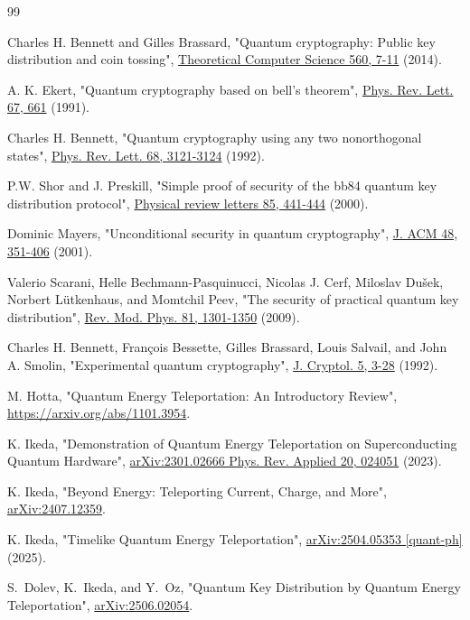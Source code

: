 \begin{thebibliography}{99}

Charles H. Bennett and Gilles Brassard,
"Quantum cryptography: Public key distribution and coin tossing",
\href{https://dx.doi.org/10.1016/j.tcs.2014.05.025}{Theoretical Computer Science 560, 7-11} (2014).

A. K. Ekert,
"Quantum cryptography based on bell's theorem",
\href{https://doi.org/10.1103/PhysRevLett.67.661}{Phys. Rev. Lett. 67, 661} (1991).

Charles H. Bennett,
"Quantum cryptography using any two nonorthogonal states",
\href{https://dx.doi.org/10.1103/PhysRevLett.68.3121}{Phys. Rev. Lett. 68, 3121-3124} (1992).

P.W. Shor and J. Preskill,
"Simple proof of security of the bb84 quantum key distribution protocol",
\href{https://dx.doi.org/10.1103/physrevlett.85.441}{Physical review letters 85, 441-444} (2000).

Dominic Mayers,
"Unconditional security in quantum cryptography",
\href{https://dx.doi.org/10.1145/382780.382781}{J. ACM 48, 351-406} (2001).

Valerio Scarani, Helle Bechmann-Pasquinucci, Nicolas J. Cerf, Miloslav Dušek, Norbert Lütkenhaus, and Momtchil Peev,
"The security of practical quantum key distribution",
\href{https://dx.doi.org/10.1103/RevModPhys.81.1301}{Rev. Mod. Phys. 81, 1301-1350} (2009).

Charles H. Bennett, François Bessette, Gilles Brassard, Louis Salvail, and John A. Smolin,
"Experimental quantum cryptography",
\href{https://dx.doi.org/10.1007/BF00191318}{J. Cryptol. 5, 3-28} (1992).

M. Hotta,
"Quantum Energy Teleportation: An Introductory Review",
\href{arXiv:1101.3954}{https://arxiv.org/abs/1101.3954}.

K. Ikeda,
"Demonstration of Quantum Energy Teleportation on Superconducting Quantum Hardware",
\href{https://arxiv.org/abs/2301.02666}{arXiv:2301.02666 Phys. Rev. Applied 20, 024051} (2023).

K. Ikeda,
"Beyond Energy: Teleporting Current, Charge, and More",
\href{https://arxiv.org/abs/2407.12359}{arXiv:2407.12359}.

K. Ikeda,
"Timelike Quantum Energy Teleportation",
\href{https://arxiv.org/abs/2504.05353}{arXiv:2504.05353 [quant-ph]} (2025).

S.~Dolev, K.~Ikeda, and Y.~Oz, 
"Quantum Key Distribution by Quantum Energy Teleportation",
\href{https://arxiv.org/abs/2506.02054}{arXiv:2506.02054}.

\end{thebibliography}
